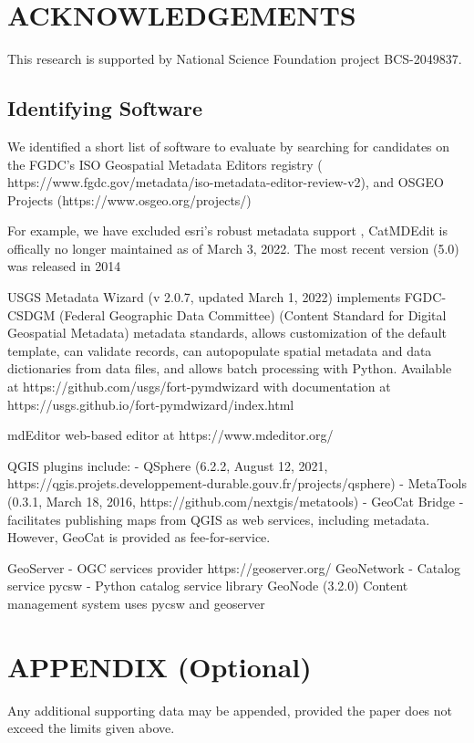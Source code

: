 \documentclass{isprs} %
\begin{document}
\section*{ACKNOWLEDGEMENTS}\label{ACKNOWLEDGEMENTS}
This research is supported by National Science Foundation project BCS-2049837.

{
	\begin{spacing}{1.17}
		\normalsize
	\end{spacing}
}

\subsection{Identifying Software}\label{software}

We identified a short list of software to evaluate by searching for candidates on the FGDC's ISO Geospatial Metadata Editors registry ( https://www.fgdc.gov/metadata/iso-metadata-editor-review-v2), and OSGEO Projects (https://www.osgeo.org/projects/)


For example, we have excluded esri's robust metadata support , CatMDEdit is offically no longer maintained as of March 3, 2022. The most recent version (5.0) was released in 2014



USGS Metadata Wizard (v 2.0.7, updated March 1, 2022) implements FGDC-CSDGM (Federal Geographic Data Committee) (Content Standard for Digital Geospatial Metadata) metadata standards, allows customization of the default template, can validate records, can autopopulate spatial metadata and data dictionaries from data files, and allows batch processing with Python. Available at https://github.com/usgs/fort-pymdwizard with documentation at https://usgs.github.io/fort-pymdwizard/index.html

mdEditor web-based editor at https://www.mdeditor.org/ 

QGIS plugins include:
- QSphere (6.2.2, August 12, 2021, https://qgis.projets.developpement-durable.gouv.fr/projects/qsphere)
- MetaTools (0.3.1, March 18, 2016, https://github.com/nextgis/metatools)
- GeoCat Bridge - facilitates publishing maps from QGIS as web services, including metadata. However, GeoCat is provided as fee-for-service.

GeoServer - OGC services provider https://geoserver.org/ 
GeoNetwork - Catalog service
pycsw - Python catalog service library
GeoNode (3.2.0) Content management system uses pycsw and geoserver









\section*{APPENDIX (Optional)}\label{APPENDIX}

Any additional supporting data may be appended, provided the paper does not exceed the limits given above. 
\end{document}
